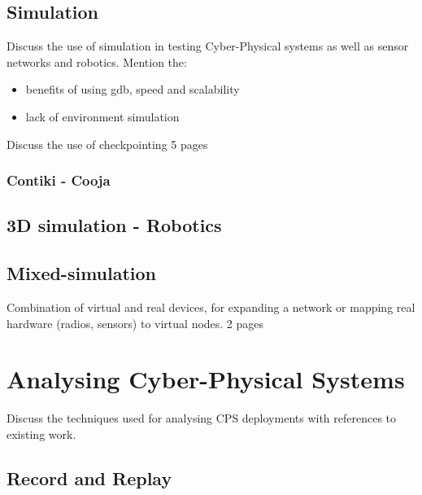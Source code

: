 \subsection{Simulation}
Discuss the use of simulation in testing Cyber-Physical systems as well as sensor networks and robotics.
Mention the:
\begin{itemize}
  \item benefits of using gdb, speed and scalability
  \item lack of environment simulation
\end{itemize}

Discuss the use of checkpointing
5 pages
\subsubsection{Contiki - Cooja}
\label{sub:Contiki - Cooja}
\subsection{3D simulation - Robotics}
\label{sub:3D simulation - Robotics}

\subsection{Mixed-simulation}
Combination of virtual and real devices, for expanding a network or mapping real hardware (radios, sensors) to virtual nodes.
2 pages

\section{Analysing Cyber-Physical Systems}
\label{sec:Analysing Cyber-Physical Systems}
Discuss the techniques used for analysing CPS deployments with references to existing work.

\subsection{Record and Replay}
\label{sub:Record and Replay}


